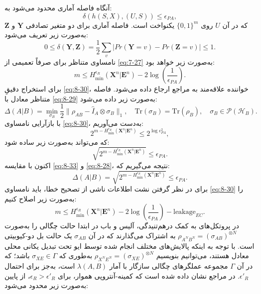 آنگاه فاصله آماری محدود می‌شود به:
\begin{equation}
	\delta(h(S,X), (U,S)) \leq \epsilon_{PA},
	\label{eq:8-28}
\end{equation}
که در آن $U$ روی $\{0,1\}^m$ یکنواخت است. فاصله آماری برای دو متغیر تصادفی $\bm{Y}$ و $\bm{Z}$ به‌صورت زیر تعریف می‌شود:
\begin{equation}
	0 \leq \delta(\bm{Y}, \bm{Z}) = \frac{1}{2} \sum_v |Pr(\bm{Y} = v) - Pr(\bm{Z} = v)| \leq 1.
	\label{eq:8-29}
\end{equation}
نامساوی متناظر برای  صرفاً تعمیمی از \eqref{eq:7-27} به‌صورت زیر خواهد بود:
\begin{equation}
	m \leq H_{\min}^{\epsilon_R}(\bm{X}^n | \bm{E}^n) - 2 \log \left( \frac{1}{\epsilon_{PA}} \right).
	\label{eq:8-30}
\end{equation}
برای استخراج دقیقِ \eqref{eq:8-30}، خواننده علاقه‌مند به مراجع \cite{8-28, 8-37} ارجاع داده می‌شود. فاصله متناظر معادل با \eqref{eq:8-29} به‌صورت زیر داده می‌شود:
\begin{equation}
	\Delta(A|B) = \min_{\sigma_B} \frac{1}{2} \|\rho_{AB} - \hat{I}_A \otimes \sigma_B\|_1, \quad \text{Tr}(\sigma_B) = \text{Tr}(\rho_B), \quad \sigma_B \in \mathcal{P}(\mathcal{H}_B).
	\label{eq:8-31}
\end{equation}
با بازآرایی نامساوی \eqref{eq:8-30}، به‌دست می‌آوریم:
\begin{equation}
	2^{m - H_{\min}^{\epsilon_R}(\bm{X}^n | \bm{E}^n)} \leq 2^{\log \epsilon_{PA}^2},
	\label{eq:8-32}
\end{equation}
که می‌تواند به‌صورت زیر ساده شود:
\begin{equation}
	\sqrt{2^{m - H_{\min}^{\epsilon_R}(\bm{X}^n | \bm{E}^n)}} \leq \epsilon_{PA}.
	\label{eq:8-33}
\end{equation}
اکنون با مقایسه \eqref{eq:8-33} و \eqref{eq:8-28}، نتیجه می‌گیریم که:
\begin{equation}
	\Delta(A|B) = \sqrt{2^{m - H_{\min}^{\epsilon_R}(\bm{X}^n | \bm{E}^n)}} \leq \epsilon_{PA}.
	\label{eq:8-34}
\end{equation}
برای در نظر گرفتن نشت اطلاعات ناشی از تصحیح خطا، باید نامساوی \eqref{eq:8-30} را به‌صورت زیر اصلاح کنیم:
\begin{equation}
	m \leq H_{\min}^{\epsilon_R}(\bm{X}^n | \bm{E}^n) - 2 \log \left( \frac{1}{\epsilon_{PA}} \right) - \text{leakage}_{EC}.
	\label{eq:8-35}
\end{equation}
در پروتکل‌های به کمک درهم‌تنیدگی، آلیس و باب در ابتدا حالت چگالی را به‌صورت $\rho_{A^N B^N} = (\sigma_{AB})^{\otimes N}$ به اشتراک می‌گذارند که در آن $\sigma_{AB}$ یک حالت بل دو-کیوبیتی است. با توجه به اینکه پالایش‌های مختلف انجام شده توسط ایو تحت تبدیل یکانی محلی معادل هستند، می‌توانیم بنویسیم $\rho_{X^N E^N} = (\sigma_{XE})^{\otimes N}$ به‌طوری که $\sigma_{XE} \in \Gamma$ باشد؛ که در آن $\Gamma$ مجموعه عملگرهای چگالی سازگار با آمار $\lambda(A,B)$ است، به‌جز برای احتمال $\epsilon'_R$. در مراجع \cite{8-28, 8-29, 8-30} نشان داده شده است که کمینه-آنتروپی هموار، برای $\epsilon_R > \epsilon'_R$، از پایین به‌صورت زیر محدود می‌شود:
